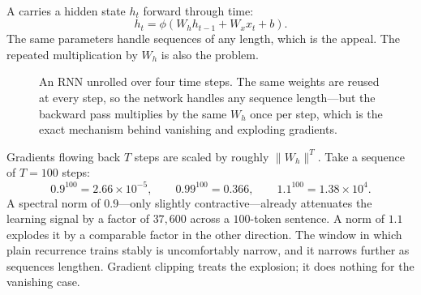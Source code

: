 A  carries a hidden state $h_t$ forward
through time\textsuperscript{\cite[][pp.~55--58]{fleuretLittleBookDeep}}:
\begin{equation}
  h_t = \phi\!\left(W_h h_{t-1} + W_x x_t + b\right).
  \label{eq:dl-rnn}
\end{equation}
The same parameters handle sequences of any length, which is the appeal. The
repeated multiplication by $W_h$ is also the problem.

\begin{figure}[htbp]
\centering
{}
\caption{An RNN unrolled over four time steps. The same weights are reused at
every step, so the network handles any sequence length---but the backward pass
multiplies by the same $W_h$ once per step, which is the exact mechanism behind
vanishing and exploding gradients.}
\label{fig:dl-rnn-unrolled}
\end{figure}

\begin{workedexample}
Gradients flowing back $T$ steps are scaled by roughly $\lVert W_h\rVert^T$.
Take a sequence of $T = 100$ steps:
\[
  0.9^{100} = 2.66\times10^{-5},
  \qquad
  0.99^{100} = 0.366,
  \qquad
  1.1^{100} = 1.38\times10^{4}.
\]
A spectral norm of $0.9$---only slightly contractive---already attenuates the
learning signal by a factor of $37{,}600$ across a $100$-token sentence. A norm
of $1.1$ explodes it by a comparable factor in the other direction. The window
in which plain recurrence trains stably is uncomfortably narrow, and it narrows
further as sequences lengthen. Gradient clipping treats the explosion; it does
nothing for the vanishing case.
\end{workedexample}

